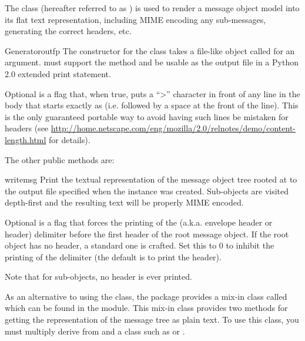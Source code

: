 \documentclass{howto}
\begin{document}
The  class (hereafter referred to as
) is used to render a message object model into its
flat text representation, including MIME encoding any sub-messages,
generating the correct  headers, etc.

\begin{classdesc}{Generator}{outfp}
The constructor for the  class takes a file-like
object called  for an argument.   must support
the  method and be usable as the output file in a
Python 2.0 extended print statement.

Optional  is a flag that, when true, puts a ``>''
character in front of any line in the body that starts exactly as
 (i.e.  followed by a space at the front of the
line).  This is the only guaranteed portable way to avoid having such
lines be mistaken for  headers (see
\url{http://home.netscape.com/eng/mozilla/2.0/relnotes/demo/content-length.html}
 for details).
\end{classdesc}

The other public  methods are:

\begin{methoddesc}[Generator]{write}{msg}
Print the textual representation of the message object tree rooted at
 to the output file specified when the 
instance was created.  Sub-objects are visited depth-first and the
resulting text will be properly MIME encoded.

Optional  is a flag that forces the printing of the
 (a.k.a. envelope header or  header)
delimiter before the first  header of the root message
object.  If the root object has no  header, a standard
one is crafted.  Set this to 0 to inhibit the printing of the
 delimiter (the default is to print the 
header).

Note that for sub-objects, no  header is ever printed.
\end{methoddesc}

As an alternative to using the  class, the
 package provides a mix-in class called
 which can be found in the
module.  This mix-in class provides two methods for getting the
representation of the message tree as plain text.  To use this class,
you must multiply derive from
 and a class such as  or
.
\end{document}
